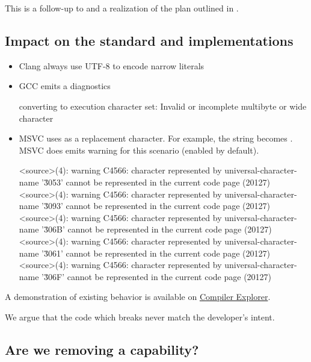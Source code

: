 \documentclass{wg21}
\begin{document}
This is a follow-up to  and a realization of the plan outlined in .

\subsection{Impact on the standard and implementations}

\begin{itemize}
\item Clang always use UTF-8 to encode narrow literals
\item GCC emits a diagnostics

\begin{quoteblock}
    converting to execution character set: Invalid or incomplete multibyte or wide character
\end{quoteblock}
\item MSVC uses  as a replacement character.
For example, the string  becomes .
MSVC does emits warning for this scenario (enabled by default).

\begin{quoteblock}
\begin{codeblock}
<source>(4): warning C4566: character represented by universal-character-name 
    '\u3053' cannot be represented in the current code page (20127)
<source>(4): warning C4566: character represented by universal-character-name
    '\u3093' cannot be represented in the current code page (20127)
<source>(4): warning C4566: character represented by universal-character-name 
    '\u306B' cannot be represented in the current code page (20127)
<source>(4): warning C4566: character represented by universal-character-name
    '\u3061' cannot be represented in the current code page (20127)
<source>(4): warning C4566: character represented by universal-character-name 
    '\u306F' cannot be represented in the current code page (20127)
\end{codeblock}
\end{quoteblock}

\end{itemize}

A demonstration of existing behavior is available on \href{https://compiler-explorer.com/z/4vheqx1oj}{Compiler Explorer}.

We argue that the code which breaks never match the developer's intent.

\subsection{Are we removing a capability?}
\end{document}
